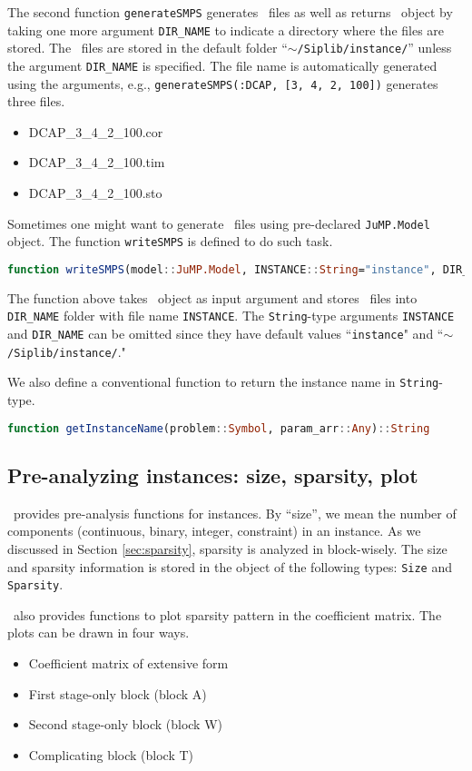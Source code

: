 The second function \texttt{generateSMPS} generates \smps\ files as well as returns \jumpmodel\ object by taking one more argument \texttt{DIR\_NAME} to indicate a directory where the files are stored. The \smps\ files are stored in the default folder ``\texttt{$\sim$/Siplib/instance/}'' unless the argument \texttt{DIR\_NAME} is specified. The file name is automatically generated using the arguments, e.g., \texttt{generateSMPS(:DCAP, [3, 4, 2, 100])} generates three files.
\begin{itemize}
	\item DCAP\_3\_4\_2\_100.cor
	\item DCAP\_3\_4\_2\_100.tim
	\item DCAP\_3\_4\_2\_100.sto
\end{itemize}
Sometimes one might want to generate \smps\ files using pre-declared \texttt{JuMP.Model} object. The function \texttt{writeSMPS} is defined to do such task.
\begin{lstlisting}[frame=single,language=julia]
function writeSMPS(model::JuMP.Model, INSTANCE::String="instance", DIR_NAME::String="$(dirname(@__FILE__))/../instance")
\end{lstlisting}
The function above takes \jumpmodel\ object as input argument and stores \smps\ files into \texttt{DIR\_NAME} folder with file name \texttt{INSTANCE}. The \texttt{String}-type arguments \texttt{INSTANCE} and \texttt{DIR\_NAME} can be omitted since they have default values ``\texttt{instance}" and ``\texttt{$\sim$/Siplib/instance/}."

We also define a conventional function to return the instance name in \texttt{String}-type.
\begin{lstlisting}[frame=single,language=julia]
function getInstanceName(problem::Symbol, param_arr::Any)::String
\end{lstlisting}

\subsection{Pre-analyzing instances: size, sparsity, plot}
\siplibjl\ provides pre-analysis functions for instances. By ``size'', we mean the number of components (continuous, binary, integer, constraint) in an instance. As we discussed in Section \ref{sec:sparsity}, sparsity is analyzed in block-wisely. The size and sparsity information is stored in the object of the following types: \texttt{Size} and \texttt{Sparsity}.

\siplibjl\ also provides functions to plot sparsity pattern in the coefficient matrix. The plots can be drawn in four ways. 
\begin{itemize}
	\item Coefficient matrix of extensive form
	\item First stage-only block (block A)
	\item Second stage-only block (block W)
	\item Complicating block (block T)
\end{itemize}

